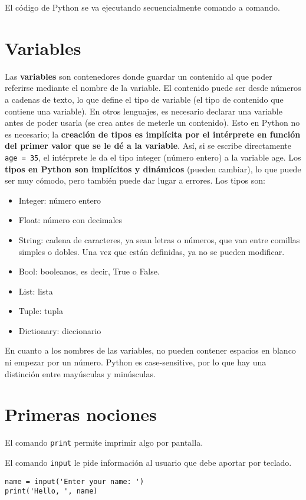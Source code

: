 El código de Python se va ejecutando secuencialmente comando a comando. 

\section{Variables}
Las \textbf{variables} son contenedores donde guardar un contenido al que poder referirse mediante el nombre de la variable. El contenido puede ser desde números a cadenas de texto, lo que define el tipo de variable (el tipo de contenido que contiene una variable). En otros lenguajes, es necesario declarar una variable antes de poder usarla (se crea antes de meterle un contenido). Esto en Python no es necesario; la \textbf{creación de tipos es implícita por el intérprete en función del primer valor que se le dé a la variable}. Así, si se escribe directamente \texttt{age = 35}, el intérprete le da el tipo integer (número entero) a la variable age. Los \textbf{tipos en Python son implícitos y dinámicos} (pueden cambiar), lo que puede ser muy cómodo, pero también puede dar lugar a errores. Los tipos son:
\begin{itemize}
\item Integer: número entero
\item Float: número con decimales
\item String: cadena de caracteres, ya sean letras o números, que van entre comillas simples o dobles. Una vez que están definidas, ya no se pueden modificar.
\item Bool: booleanos, es decir, True o False.
\item List: lista
\item Tuple: tupla
\item Dictionary: diccionario
\end{itemize}

En cuanto a los nombres de las variables, no pueden contener espacios en blanco ni empezar por un número. Python es case-sensitive, por lo que hay una distinción entre mayúsculas y minúsculas. 

\section{Primeras nociones}
El comando \texttt{print} permite imprimir algo por pantalla. 

El comando \texttt{input} le pide información al usuario que debe aportar por teclado.
\begin{lstlisting}
name = input('Enter your name: ')
print('Hello, ', name)
\end{lstlisting}

